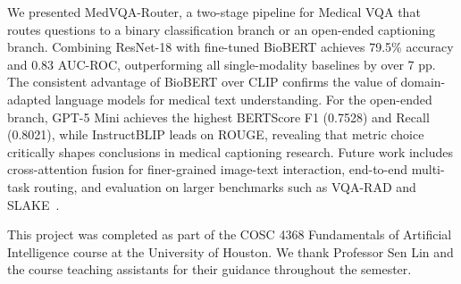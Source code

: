 \documentclass{article}
\begin{document}
We presented MedVQA-Router, a two-stage pipeline for Medical VQA that routes
questions to a binary classification branch or an open-ended captioning branch.
Combining ResNet-18 with fine-tuned BioBERT achieves 79.5\% accuracy and 0.83
AUC-ROC, outperforming all single-modality baselines by over 7 pp. The
consistent advantage of BioBERT over CLIP confirms the value of domain-adapted
language models for medical text understanding. For the open-ended branch,
GPT-5 Mini achieves the highest BERTScore F1 (0.7528) and Recall (0.8021), 
while InstructBLIP leads on ROUGE, revealing that metric choice
critically shapes conclusions in medical captioning research. Future work
includes cross-attention fusion for finer-grained image-text interaction,
end-to-end multi-task routing, and evaluation on larger benchmarks such as
VQA-RAD and SLAKE~\cite{liu2021slake}.


\begin{ack}
This project was completed as part of the COSC 4368 Fundamentals of Artificial
Intelligence course at the University of Houston. We thank Professor Sen Lin
and the course teaching assistants for their guidance throughout the semester.
\end{ack}


\newpage




\appendix
\end{document}
